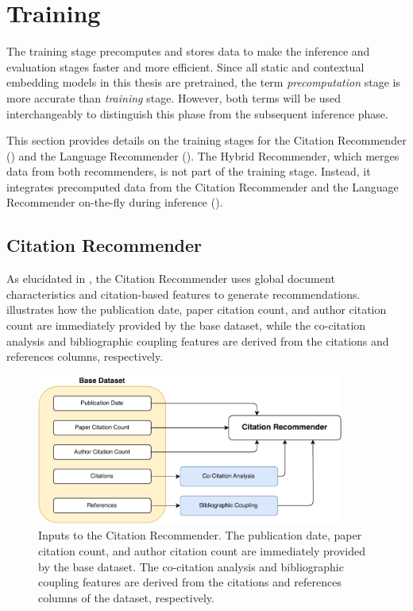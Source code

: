 \section{Training} \label{sec:training}

The training stage precomputes and stores data to make the inference and evaluation stages faster and more efficient. Since all static and contextual embedding models in this thesis are pretrained, the term \emph{precomputation} stage is more accurate than \emph{training} stage. However, both terms will be used interchangeably to distinguish this phase from the subsequent inference phase.

This section provides details on the training stages for the Citation Recommender () and the Language Recommender (). The Hybrid Recommender, which merges data from both recommenders, is not part of the training stage. Instead, it integrates precomputed data from the Citation Recommender and the Language Recommender on-the-fly during inference ().


\subsection{Citation Recommender} \label{sec:citation-recommender}

As elucidated in , the Citation Recommender uses global document characteristics and citation-based features to generate recommendations.
 illustrates how the publication date, paper citation count, and author citation count are immediately provided by the base dataset, while the co-citation analysis and bibliographic coupling features are derived from the citations and references columns, respectively.

\begin{figure}[htb!]
    \centering
    \includegraphics[width=0.9\textwidth]{diagrams/citation_recommender.pdf}
    \caption[Citation Recommender]{Inputs to the Citation Recommender. The publication date, paper citation count, and author citation count are immediately provided by the base dataset. The co-citation analysis and bibliographic coupling features are derived from the citations and references columns of the dataset, respectively.}
    \label{fig:citation-recommender}
\end{figure}

